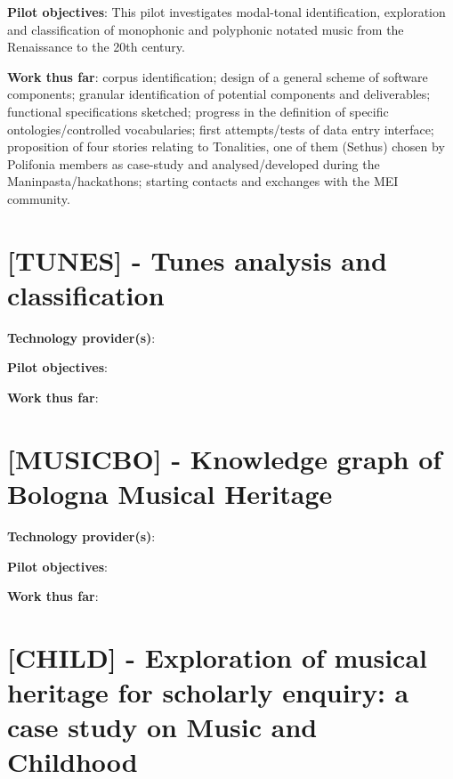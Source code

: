 \textbf{Pilot objectives}: 
This pilot investigates modal-tonal identification, exploration and classification of monophonic and polyphonic notated music from the Renaissance to the 20th century.

\textbf{Work thus far}:
corpus identification; design of a general scheme of software components; granular identification of potential components and deliverables; functional specifications sketched; progress in the definition of specific ontologies/controlled vocabularies; first attempts/tests of data entry interface; proposition of four stories relating to Tonalities, one of them (Sethus) chosen by Polifonia members as case-study and analysed/developed during the Maninpasta/hackathons; starting contacts and exchanges with the MEI community.

\section{[TUNES] - Tunes analysis and classification}\label{sec:pilot:tunes}


\textbf{Technology provider(s)}: 

\textbf{Pilot objectives}:

\textbf{Work thus far}:

\section{[MUSICBO] - Knowledge graph of Bologna Musical Heritage}\label{sec:pilot:tunes}


\textbf{Technology provider(s)}: 

\textbf{Pilot objectives}:

\textbf{Work thus far}:

\section{[CHILD] - Exploration of musical heritage for scholarly enquiry: a case study on Music and Childhood}\label{sec:pilot:child}

